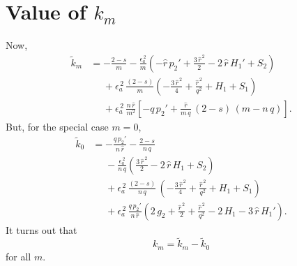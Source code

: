 \documentclass[12pt,prb,aps,notitlepage]{revtex4-1}
\begin{document}
\section{Value of $k_m$}
Now, 
\begin{align}
\tilde{k}_m&= -\frac{2-s}{m}
-\frac{\epsilon_a^{\,2}}{m}\left(-\hat{r}\,p_2'+
\frac{3\,\hat{r}^{\,2}}{2}-2\,\hat{r}\,H_1' +S_2\right)\nonumber\\[0.5ex]
&\phantom{=}
+\epsilon_a^{\,2}\,\frac{(2-s)}{m}\left(-\frac{3\,\hat{r}^{\,2}}{4} +\frac{\hat{r}^{\,2}}{q^2}+H_1+S_1\right)\nonumber\\[0.5ex]
&\phantom{=}
+\epsilon_a^{\,2}\,\frac{n\,\hat{r}}{m^2}\left[-q\,p_2' + \frac{\hat{r}}{m\,q}\,(2-s)\,(m-n\,q)\right].
\end{align}
But, for the special case $m=0$, 
\begin{align}
\tilde{k}_0 &= - \frac{q\,p_2'}{n\,\hat{r}} - \frac{2-s}{n\,q} 
\nonumber\\[0.5ex]
&\phantom{=}-\frac{\epsilon_a^{\,2}}{n\,q}\left(
\frac{3\,\hat{r}^{\,2}}{2}-2\,\hat{r}\,H_1+S_2\right)\nonumber\\[0.5ex]
&\phantom{=}
+\epsilon_a^{\,2}\,\frac{(2-s)}{n\,q}\,\left(-\frac{3\,\hat{r}^{\,2}}{4} +\frac{\hat{r}^{\,2}}{q^2}+H_1 +S_1\right)\nonumber\\[0.5ex]
&\phantom{=}
+\epsilon_a^{\,2}\,\frac{q\,p_2'}{n\,\hat{r}}\left(2\,g_2+\frac{\hat{r}^{\,2}}{2}+\frac{\hat{r}^{\,2}}{q^2}-2\,H_1-3\,\hat{r}\,H_1'\right).
\end{align}
It turns out that
\begin{equation}
k_m = \tilde{k}_m - \tilde{k}_0
\end{equation}
for all $m$. 


\iffalse
\end{document}
